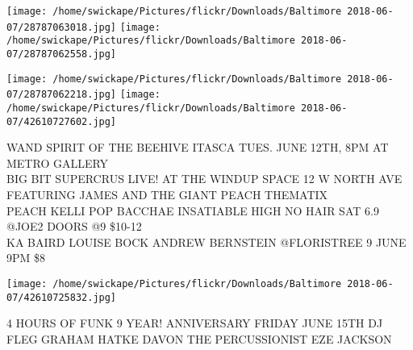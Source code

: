 \documentclass[10pt,letterpaper]{article}
\begin{document}
\texttt{[image: /home/swickape/Pictures/flickr/Downloads/Baltimore 2018-06-07/28787063018.jpg]}
\texttt{[image: /home/swickape/Pictures/flickr/Downloads/Baltimore 2018-06-07/28787062558.jpg]}

\texttt{[image: /home/swickape/Pictures/flickr/Downloads/Baltimore 2018-06-07/28787062218.jpg]}
\texttt{[image: /home/swickape/Pictures/flickr/Downloads/Baltimore 2018-06-07/42610727602.jpg]}

WAND SPIRIT OF THE BEEHIVE ITASCA TUES. JUNE 12TH, 8PM AT METRO GALLERY\\
BIG BIT SUPERCRUS LIVE! AT THE WINDUP SPACE 12 W NORTH AVE FEATURING JAMES AND THE GIANT PEACH THEMATIX\\
PEACH KELLI POP BACCHAE INSATIABLE HIGH NO HAIR SAT 6.9 @JOE2 DOORS @9 \$10{-}12\\
KA BAIRD LOUISE BOCK ANDREW BERNSTEIN @FLORISTREE 9 JUNE 9PM \$8\\
\pagebreak

\texttt{[image: /home/swickape/Pictures/flickr/Downloads/Baltimore 2018-06-07/42610725832.jpg]}

4 HOURS OF FUNK 9 YEAR! ANNIVERSARY FRIDAY JUNE 15TH DJ FLEG GRAHAM HATKE DAVON THE PERCUSSIONIST EZE JACKSON\\
\pagebreak
\end{document}
